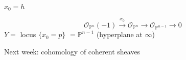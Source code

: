 \documentclass [letterpaper,11pt,twoside]{article}
\begin{document}
    \begin{example*}
      $x_0 = h$

      $$\mathcal O_{\mathbb P^n}(-1) \xrightarrow{x_0} \mathcal O_{\mathbb P^n}
      \to \mathcal O_{\mathbb P^{n-1}} \to 0$$
      $Y = $ locus $\{x_0 = p\}$ $ = \mathbb P^{n-1}$ (hyperplane at $\infty$)
    \end{example*}

    Next week: cohomology of coherent sheaves
\end{document}

